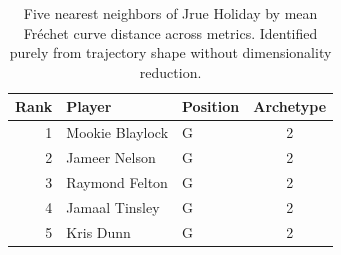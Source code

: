 \begin{table}[htbp]
  \centering\small
  \begin{tabular}{rllc}
    \toprule
    Rank & Player & Position & Archetype \\
    \midrule
    1 & Mookie Blaylock & G & 2 \\
    2 & Jameer Nelson & G & 2 \\
    3 & Raymond Felton & G & 2 \\
    4 & Jamaal Tinsley & G & 2 \\
    5 & Kris Dunn & G & 2 \\
    \bottomrule
  \end{tabular}
  \caption{Five nearest neighbors of Jrue Holiday by mean Fr\'{e}chet curve distance across metrics. Identified purely from trajectory shape without dimensionality reduction.}
  \label{tab:Jrue_Holiday_frechet_curve_neighbors}
\end{table}

